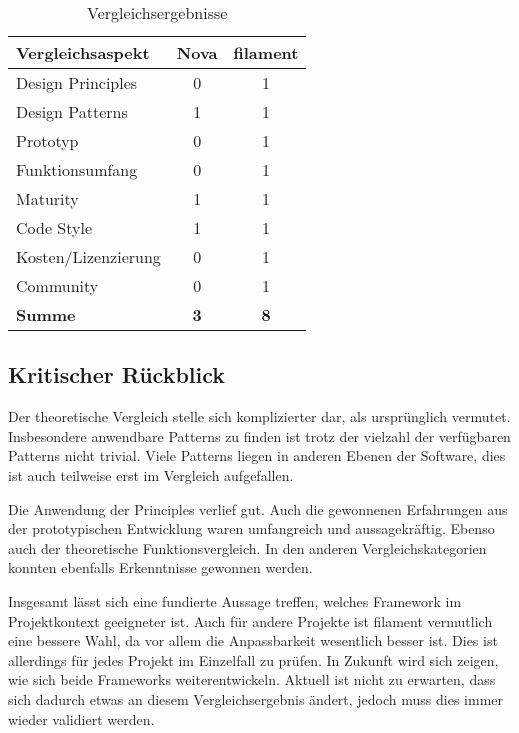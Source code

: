 \begin{table}[h!]
    \centering
    \caption{Vergleichsergebnisse}
    \label{tab:vergleichsergebnisse}
    \begin{tabular}{|l|c|c|}
        \hline
        \textbf{Vergleichsaspekt} & \textbf{Nova} & \textbf{filament} \\ \hline
        Design Principles         & 0             & 1                 \\ \hline
        Design Patterns           & 1             & 1                 \\ \hline
        Prototyp                  & 0             & 1                 \\ \hline
        Funktionsumfang           & 0             & 1                 \\ \hline
        Maturity                  & 1             & 1                 \\ \hline
        Code Style                & 1             & 1                 \\ \hline
        Kosten/Lizenzierung       & 0             & 1                 \\ \hline
        Community                 & 0             & 1                 \\ \hline
        \textbf{Summe}            & \textbf{3}    & \textbf{8}        \\ \hline
    \end{tabular}
\end{table}

\newpage

\subsection{Kritischer Rückblick}
Der theoretische Vergleich stelle sich komplizierter dar, als ursprünglich vermutet.
Insbesondere anwendbare Patterns zu finden ist trotz der vielzahl der verfügbaren Patterns nicht trivial.
Viele Patterns liegen in anderen Ebenen der Software, dies ist auch teilweise erst im Vergleich aufgefallen.

Die Anwendung der Principles verlief gut.
Auch die gewonnenen Erfahrungen aus der prototypischen Entwicklung waren umfangreich und aussagekräftig.
Ebenso auch der theoretische Funktionsvergleich.
In den anderen Vergleichskategorien konnten ebenfalls Erkenntnisse gewonnen werden.

Insgesamt lässt sich eine fundierte Aussage treffen, welches Framework im Projektkontext geeigneter ist.
Auch für andere Projekte ist filament vermutlich eine bessere Wahl, da vor allem die Anpassbarkeit wesentlich besser ist.
Dies ist allerdings für jedes Projekt im Einzelfall zu prüfen.
In Zukunft wird sich zeigen, wie sich beide Frameworks weiterentwickeln.
Aktuell ist nicht zu erwarten, dass sich dadurch etwas an diesem Vergleichsergebnis ändert, jedoch muss dies immer wieder validiert werden.

